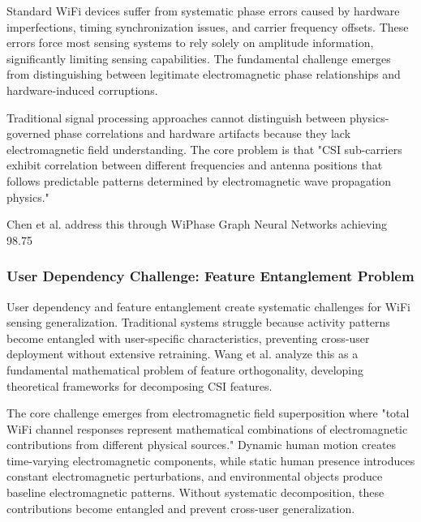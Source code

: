 \documentclass[journal]{IEEEtran}
\begin{document}
Standard WiFi devices suffer from systematic phase errors caused by hardware imperfections, timing synchronization issues, and carrier frequency offsets. These errors force most sensing systems to rely solely on amplitude information, significantly limiting sensing capabilities. The fundamental challenge emerges from distinguishing between legitimate electromagnetic phase relationships and hardware-induced corruptions.

Traditional signal processing approaches cannot distinguish between physics-governed phase correlations and hardware artifacts because they lack electromagnetic field understanding. The core problem is that "CSI sub-carriers exhibit correlation between different frequencies and antenna positions that follows predictable patterns determined by electromagnetic wave propagation physics."

Chen et al. address this through WiPhase Graph Neural Networks achieving 98.75%

\subsubsection{User Dependency Challenge: Feature Entanglement Problem}

User dependency and feature entanglement create systematic challenges for WiFi sensing generalization. Traditional systems struggle because activity patterns become entangled with user-specific characteristics, preventing cross-user deployment without extensive retraining. Wang et al. \cite{wang2024feature} analyze this as a fundamental mathematical problem of feature orthogonality, developing theoretical frameworks for decomposing CSI features.

The core challenge emerges from electromagnetic field superposition where "total WiFi channel responses represent mathematical combinations of electromagnetic contributions from different physical sources." Dynamic human motion creates time-varying electromagnetic components, while static human presence introduces constant electromagnetic perturbations, and environmental objects produce baseline electromagnetic patterns. Without systematic decomposition, these contributions become entangled and prevent cross-user generalization.
\end{document}
